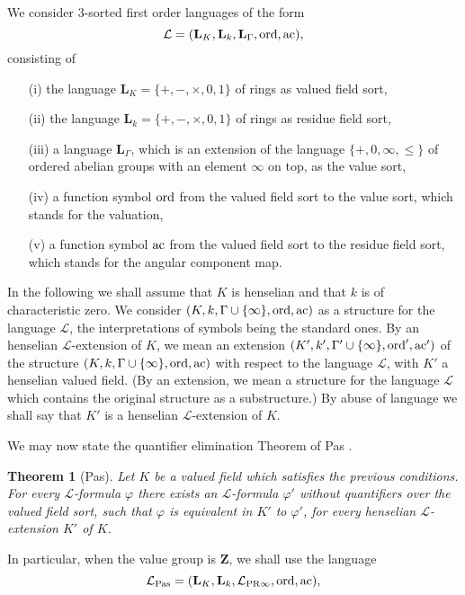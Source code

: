 \documentclass[english,12pt]{amsart}
\def\ac{{\rm ac}}
\let\cal\mathcal
\def\LL{{\mathbf L}}
\def\ZZ{{\mathbf Z}}
\def\cL{{\mathcal L}}
\newtheorem{theorem}[subsubsection]{Theorem}
\theoremstyle{definition}
\theoremstyle{remark}
\theoremstyle{plain}
\numberwithin{equation}{subsection}
\let\cal\mathcal
\def\LL{{\mathbf L}}
\def\ZZ{{\mathbf Z}}
\def\cL{{\mathcal L}}
\def\ord{{\rm ord}}
\begin{document}
We consider 3-sorted first order languages
of the form 
$$
\cL = (\LL_{K}, \LL_{k}, \LL_{\Gamma}, \ord, \ac),
$$
consisting of
\begin{enumerate}
\item[(i)] the language $\LL_{K} = \{+, -, \times, 0, 1\}$ of rings as 
valued
field sort,
\item[(ii)] the language $\LL_{k} = \{+, -, \times, 0, 1\}$ of rings as 
residue field sort,
\item[(iii)] a language $\LL_{\Gamma}$, which is an extension of the 
language $\{+, 0, \infty, \leq\}$ of ordered abelian groups with an 
element $\infty$
on top, as the value sort,
\item[(iv)] a function symbol $\ord$ from the valued field
sort to
the value sort, which stands for the valuation,
\item[(v)]  a function symbol $\ac$ from the valued field sort to
the residue field sort, which stands for the angular component map.
\end{enumerate}





In the following we shall assume that $K$ is henselian and that $k$ 
is of characteristic zero.
We consider $(K, k, \Gamma \cup \{\infty\}, \ord, \ac)$ as
a structure
for the language $\cL$, the interpretations of symbols being the 
standard ones. By an  henselian
$\cL$-extension of $K$, we mean an
extension
$(K', k', \Gamma' \cup \{\infty\}, \ord', \ac')$ of the structure
$(K, k, \Gamma \cup \{\infty\}, \ord, \ac)$ with respect to the language
$\cL$, with $K'$ a henselian valued field.
(By an extension, we mean a structure for the language $\cL$
which contains the original structure as a substructure.)
By abuse of language we shall
say that $K'$ is a henselian $\cL$-extension of $K$.




We may now state the quantifier elimination Theorem of Pas 
\cite{Pas}.




\begin{theorem}[Pas]\label{GPas}Let $K$ be a valued field
which satisfies the previous
conditions. For every  $\cal L$-formula $\varphi$ there exists 
an $\cal L$-formula $\varphi'$
without quantifiers over the valued field sort, such that
$\varphi$
is equivalent
in $K'$ to $\varphi'$, for every
henselian $\cL$-extension $K'$ of $K$.
\end{theorem}


In particular, when the value group is $\ZZ$, we shall use the language
$$
\cL_{\rm Pas} = (\LL_{K}, \LL_{k}, \cL_{\rm PR \infty}, \ord, \ac),
$$
\end{document}
